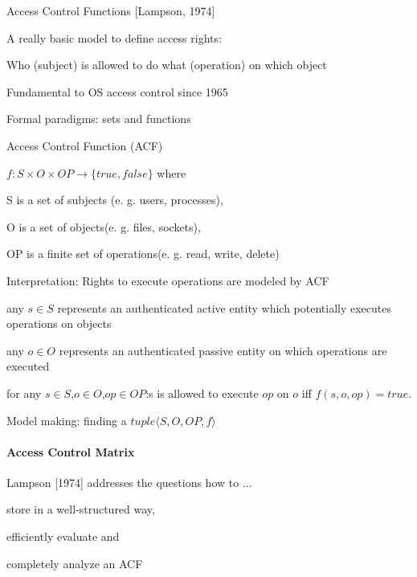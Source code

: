 \documentclass[a4paper]{article}
\begin{document}
\begin{multicols}{3}
    Access Control Functions [Lampson, 1974]
    \begin{itemize*}
        \item A really basic model to define access rights:
        \begin{itemize*}
            \item Who (subject) is allowed to do what (operation) on which object
            \item Fundamental to OS access control since 1965
            \item Formal paradigms: sets and functions
        \end{itemize*}
        \item Access Control Function (ACF)
        \begin{itemize*}
            \item $f:S \times O \times OP \rightarrow \{true,false\}$ where
            \item S is a set of subjects (e. g. users, processes),
            \item O is a set of objects(e. g. files, sockets),
            \item OP is a finite set of operations(e. g. read, write, delete)
        \end{itemize*}
        \item Interpretation: Rights to execute operations are modeled by ACF
        \begin{itemize*}
            \item any $s\in S$ represents an authenticated active entity which potentially executes operations on objects
            \item any $o\in O$ represents an authenticated passive entity on which operations are executed
            \item for any $s\in S$,$o\in O$,$op\in OP$:s is allowed to execute $op$ on $o$ iff $f(s,o,op)=true$.
            \item Model making: finding a $tuple\langle S,O,OP,f\rangle$
        \end{itemize*}
    \end{itemize*}

    \paragraph{Access Control Matrix}
    Lampson [1974] addresses the questions how to ...
    \begin{itemize*}
        \item store in a well-structured way,
        \item efficiently evaluate and
        \item completely analyze an ACF
    \end{itemize*}


\end{multicols}
\end{document}
